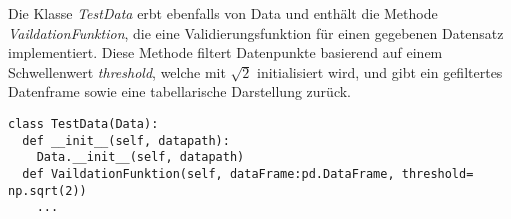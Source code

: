 Die Klasse \textit{TestData} erbt ebenfalls von Data und enthält die Methode \textit{VaildationFunktion}, die eine Validierungsfunktion für einen gegebenen Datensatz implementiert. Diese Methode filtert Datenpunkte basierend auf einem Schwellenwert \textit{threshold}, welche mit $\sqrt{2}$ initialisiert wird, und gibt ein gefiltertes Datenframe sowie eine tabellarische Darstellung zurück.

\begin{lstlisting}[caption={class TestData}, captionpos=b, label={lst:class IdealFcns}]
class TestData(Data):
  def __init__(self, datapath):
    Data.__init__(self, datapath)
  def VaildationFunktion(self, dataFrame:pd.DataFrame, threshold= np.sqrt(2))
    ...
\end{lstlisting}

